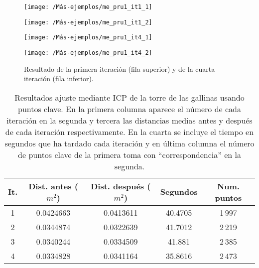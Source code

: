 \begin{figure}[h!]	
	\begin{minipage}[b]{0.5\textwidth}
		\centering		
		\texttt{[image: /Más-ejemplos/me\_pru1\_it1\_1]} 
	\end{minipage}
	\begin{minipage}[b]{0.5\textwidth}
		\centering
		\texttt{[image: /Más-ejemplos/me\_pru1\_it1\_2]}
	\end{minipage}
	\begin{minipage}[b]{0.5\textwidth}
		\centering		
		\texttt{[image: /Más-ejemplos/me\_pru1\_it4\_1]} 
	\end{minipage}
	\begin{minipage}[b]{0.5\textwidth}
		\centering
		\texttt{[image: /Más-ejemplos/me\_pru1\_it4\_2]}
	\end{minipage}
	\caption{Resultado de la primera iteración (fila superior) y de la cuarta iteración (fila inferior).}
	\label{fig:ICPtorre}
\end{figure}

\begin{comment}
EN los segundos me salía entorno a 17!!!! con cota unos 0.003
\end{comment}

\begin{table}[h!]
	\centering
	\begin{tabular}{| c | c | c | c | c |} 
		\hline
		It. & Dist. antes ($ m^2 $) & Dist. después ($ m^2 $) & Segundos & Num. puntos \\
		\hline
		1 &  0.0424663 & 0.0413611 & 40.4705 & 1\,997 \\				  
		2 & 0.0344874 & 0.0322639 & 41.7012 & 2\,219  \\	
		3 & 0.0340244 & 0.0334509  & 41.881 &  2\,385 \\
		4 & 0.0334828 &  0.0341164 & 35.8616 & 2\,473\\
		\hline
	\end{tabular}
	\caption{Resultados ajuste mediante ICP de la torre de las gallinas usando puntos clave. En la primera columna aparece el número de cada iteración en la segunda y tercera las distancias medias antes y después de cada iteración respectivamente. En la cuarta se incluye el tiempo en segundos que ha tardado cada iteración y en última columna el número de puntos clave de la primera toma con ``correspondencia'' en la segunda.}
\end{table}

